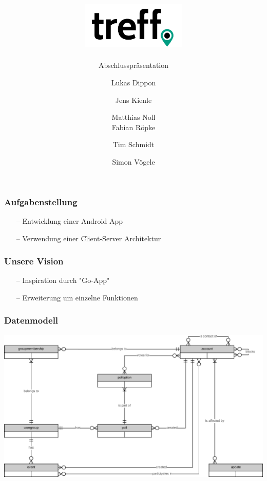 \documentclass[aspectratio=1610]{beamer}
\title{\includegraphics[width = 50mm]{images/logo_crop.png}}
\subtitle{\huge Abschlusspräsentation}
\author{Lukas Dippon
	\and Jens Kienle
	\and Matthias Noll
    \\Fabian Röpke
	\and Tim Schmidt
	\and Simon Vögele}
\begin{document}
	\begin{frame}[plain]
	\maketitle
	\end{frame}


	\begin{frame}[plain]
      \frametitle{\textbf{Aufgabenstellung}}
      \begin{itemize}
        \item[--] Entwicklung einer Android App
        \item[--] Verwendung einer Client-Server Architektur
      \end{itemize}
  \end{frame}

  \begin{frame}[plain]
      \frametitle{\textbf{Unsere Vision}}
      \begin{itemize}
        \item[--] Inspiration durch "Go-App"
        \item[--] Erweiterung um einzelne Funktionen
      \end{itemize}
  \end{frame}

  \begin{frame}[plain]
      \frametitle{\textbf{Datenmodell}}
      \includegraphics[width = \columnwidth - 30pt]
        {images/erd.png}
  \end{frame}

\end{document}
